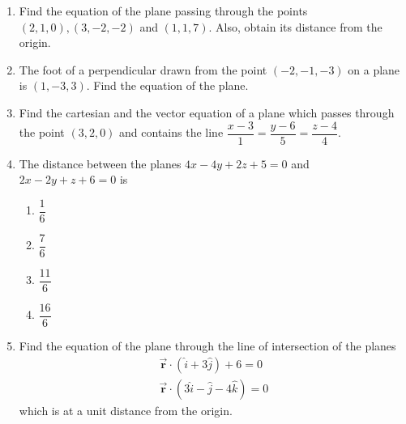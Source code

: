 %
\begin{enumerate}
\item Find the equation of the plane passing through the points $(2,1,0),(3,-2,-2)$ and $(1,1,7)$. Also, obtain its distance from the origin.
\item The foot of a perpendicular drawn from the point $(-2,-1,-3)$ on a plane is $(1,-3,3)$. Find the equation of the plane.
\item Find the cartesian and the vector equation of a plane which passes through the point $(3,2,0)$ and contains the line $\dfrac{x-3}{1}=\dfrac{y-6}{5}=\dfrac{z-4}{4}$.
\item The distance between the planes $4x-4y+2z+5=0$ and $2x-2y+z+6=0$ is
	\begin{enumerate}
	\item $\dfrac{1}{6}$
	\item $\dfrac{7}{6}$
	\item $\dfrac{11}{6}$
	\item $\dfrac{16}{6}$
	\end{enumerate}
\item Find the equation of the plane through the line of intersection of the planes \begin{align}
		&\overrightarrow{\textbf{r}}\cdot(\hat{i}+3\hat{j})+6=0& \\&\overrightarrow{\textbf{r}}\cdot(3\hat{i}-\hat{j}-4\hat{k})=0&
\end{align}which is at a  unit distance from the origin.
\end{enumerate}
%
